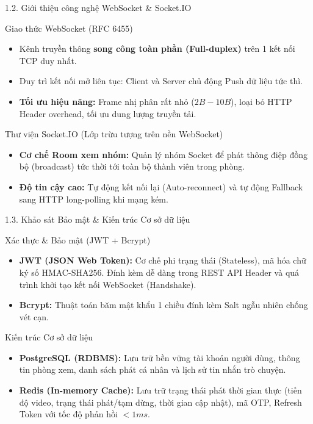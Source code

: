 \documentclass[aspectratio=169,11pt]{beamer}
\begin{document}
\begin{frame}{1.2. Giới thiệu công nghệ WebSocket \& Socket.IO}
    \begin{block}{Giao thức WebSocket (RFC 6455)}
        \begin{itemize}
            \item Kênh truyền thông \textbf{song công toàn phần (Full-duplex)} trên 1 kết nối TCP duy nhất.
            \item Duy trì kết nối mở liên tục: Client và Server chủ động Push dữ liệu tức thì.
            \item \textbf{Tối ưu hiệu năng:} Frame nhị phân rất nhỏ ($2B - 10B$), loại bỏ HTTP Header overhead, tối ưu dung lượng truyền tải.
        \end{itemize}
    \end{block}
    
    \vspace{0.1cm}
    \begin{block}{Thư viện Socket.IO (Lớp trừu tượng trên nền WebSocket)}
        \begin{itemize}
            \item \textbf{Cơ chế Room xem nhóm:} Quản lý nhóm Socket để phát thông điệp đồng bộ (broadcast) tức thời tới toàn bộ thành viên trong phòng.
            \item \textbf{Độ tin cậy cao:} Tự động kết nối lại (Auto-reconnect) và tự động Fallback sang HTTP long-polling khi mạng kém.
        \end{itemize}
    \end{block}
\end{frame}

\begin{frame}{1.3. Khảo sát Bảo mật \& Kiến trúc Cơ sở dữ liệu}
    \begin{block}{Xác thực \& Bảo mật (JWT + Bcrypt)}
        \begin{itemize}
            \item \textbf{JWT (JSON Web Token):} Cơ chế phi trạng thái (Stateless), mã hóa chữ ký số HMAC-SHA256. Đính kèm dễ dàng trong REST API Header và quá trình khởi tạo kết nối WebSocket (Handshake).
            \item \textbf{Bcrypt:} Thuật toán băm mật khẩu 1 chiều đính kèm Salt ngẫu nhiên chống vét cạn.
        \end{itemize}
    \end{block}
    
    \vspace{0.2cm}
    \begin{block}{Kiến trúc Cơ sở dữ liệu}
        \begin{itemize}
            \item \textbf{PostgreSQL (RDBMS):} Lưu trữ bền vững tài khoản người dùng, thông tin phòng xem, danh sách phát cá nhân và lịch sử tin nhắn trò chuyện.
            \item \textbf{Redis (In-memory Cache):} Lưu trữ trạng thái phát thời gian thực (tiến độ video, trạng thái phát/tạm dừng, thời gian cập nhật), mã OTP, Refresh Token với tốc độ phản hồi $<1ms$.
        \end{itemize}
    \end{block}
\end{frame}
\end{document}
